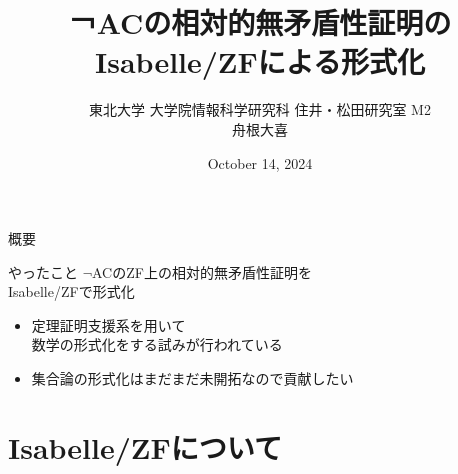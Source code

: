 \documentclass[17pt,aspectratio=169]{beamer}
\title{￢ACの相対的無矛盾性証明のIsabelle/ZFによる形式化}
\author{東北大学 大学院情報科学研究科 住井・松田研究室 M2\\ 舟根大喜}
\date{October 14, 2024}
\begin{document}
\maketitle

\begin{frame}{概要}
    \begin{itembox}[l]{やったこと}
        $\neg$ACのZF上の相対的無矛盾性証明を\\
        Isabelle/ZFで形式化
    \end{itembox}
    {\small
    \begin{itemize}
        \item 定理証明支援系を用いて\\
        数学の形式化をする試みが行われている
        \item 集合論の形式化はまだまだ未開拓なので貢献したい %
    \end{itemize}}
\end{frame}

\section{Isabelle/ZFについて}
\end{document}
